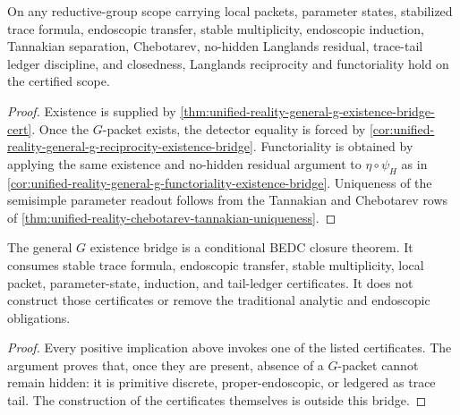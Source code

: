 \begin{theorem}
\label{thm:unified-reality-general-g-bedc-langlands-closure}
On any reductive-group scope carrying local packets, parameter states,
stabilized trace formula, endoscopic transfer, stable multiplicity,
endoscopic induction, Tannakian separation, Chebotarev, no-hidden
Langlands residual, trace-tail ledger discipline, and closedness,
Langlands reciprocity and functoriality hold on the certified scope.
\end{theorem}
\begin{proof}
Existence is supplied by
\autoref{thm:unified-reality-general-g-existence-bridge-cert}. Once the
$G$-packet exists, the detector equality is forced by
\autoref{cor:unified-reality-general-g-reciprocity-existence-bridge}.
Functoriality is obtained by applying the same existence and no-hidden
residual argument to $\eta\circ\psi_H$ as in
\autoref{cor:unified-reality-general-g-functoriality-existence-bridge}.
Uniqueness of the semisimple parameter readout follows from the
Tannakian and Chebotarev rows of
\autoref{thm:unified-reality-chebotarev-tannakian-uniqueness}.
\end{proof}

\begin{theorem}
\label{thm:unified-reality-general-g-existence-bridge-boundary}
The general $G$ existence bridge is a conditional BEDC closure theorem.
It consumes stable trace formula, endoscopic transfer, stable
multiplicity, local packet, parameter-state, induction, and tail-ledger
certificates. It does not construct those certificates or remove the
traditional analytic and endoscopic obligations.
\end{theorem}
\begin{proof}
Every positive implication above invokes one of the listed
certificates. The argument proves that, once they are present, absence
of a $G$-packet cannot remain hidden: it is primitive discrete,
proper-endoscopic, or ledgered as trace tail. The construction of the
certificates themselves is outside this bridge.
\end{proof}
